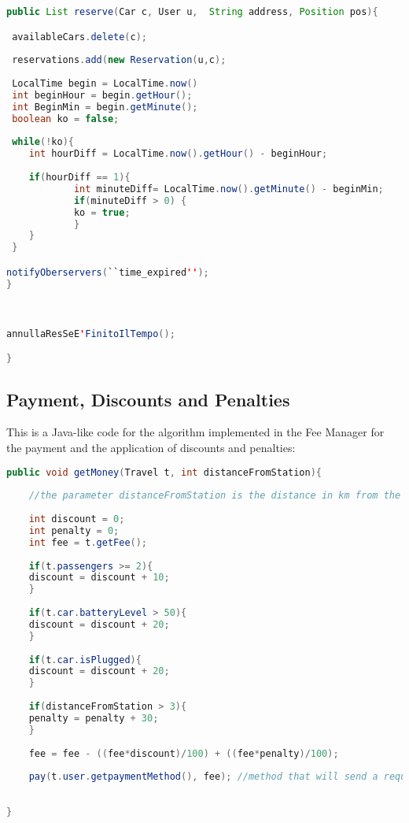 \begin{lstlisting}[language=Java]
public List reserve(Car c, User u,  String address, Position pos){

 availableCars.delete(c);
 
 reservations.add(new Reservation(u,c);
 
 LocalTime begin = LocalTime.now()
 int beginHour = begin.getHour();
 int BeginMin = begin.getMinute();
 boolean ko = false;
 
 while(!ko){
  	int hourDiff = LocalTime.now().getHour() - beginHour;
  
 	if(hourDiff == 1){
     		int minuteDiff= LocalTime.now().getMinute() - beginMin;
     		if(minuteDiff > 0) {
      		ko = true;		   
     		}
  	}
 }

notifyOberservers(``time_expired'');
}
 


annullaResSeE'FinitoIlTempo();

}
\end{lstlisting}

\newpage

\subsection{Payment, Discounts and Penalties}

This is a Java-like code for the algorithm implemented in the Fee Manager for the payment and the application of discounts and penalties:

\begin{lstlisting}[language=Java]
public void getMoney(Travel t, int distanceFromStation){
	
	//the parameter distanceFromStation is the distance in km from the parking position to the nearest charging station, calculated by the Trip Manager
	
	int discount = 0;
	int penalty = 0;
	int fee = t.getFee();
	
	if(t.passengers >= 2){
	discount = discount + 10;
	}
	
	if(t.car.batteryLevel > 50){
	discount = discount + 20;
	}
	
	if(t.car.isPlugged){
	discount = discount + 20;
	}
	
	if(distanceFromStation > 3){
	penalty = penalty + 30;
	}
	
	fee = fee - ((fee*discount)/100) + ((fee*penalty)/100);
	
	pay(t.user.getpaymentMethod(), fee); //method that will send a request for the payment to the payment node, according to payment method of the user 
	
	
}


\end{lstlisting}